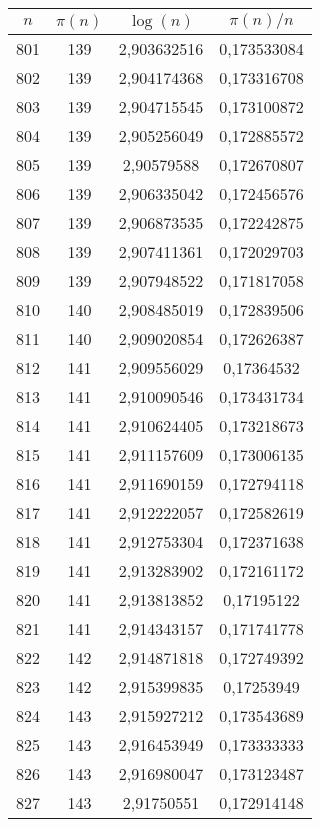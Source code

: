 {\begin{minipage}[!h]{0.45\textwidth}\centering
\tiny
\begin{longtable}{cccc} \hline
\(n\) & \(\pi(n)\) & \(\log(n)\) & \(\pi(n)/n\) \\ \hline
801 & 139 & 2,903632516 & 0,173533084 \\ \hline
802 & 139 & 2,904174368 & 0,173316708 \\ \hline
803 & 139 & 2,904715545 & 0,173100872 \\ \hline
804 & 139 & 2,905256049 & 0,172885572 \\ \hline
805 & 139 & 2,90579588 & 0,172670807 \\ \hline
806 & 139 & 2,906335042 & 0,172456576 \\ \hline
807 & 139 & 2,906873535 & 0,172242875 \\ \hline
808 & 139 & 2,907411361 & 0,172029703 \\ \hline
809 & 139 & 2,907948522 & 0,171817058 \\ \hline
810 & 140 & 2,908485019 & 0,172839506 \\ \hline
811 & 140 & 2,909020854 & 0,172626387 \\ \hline
812 & 141 & 2,909556029 & 0,17364532 \\ \hline
813 & 141 & 2,910090546 & 0,173431734 \\ \hline
814 & 141 & 2,910624405 & 0,173218673 \\ \hline
815 & 141 & 2,911157609 & 0,173006135 \\ \hline
816 & 141 & 2,911690159 & 0,172794118 \\ \hline
817 & 141 & 2,912222057 & 0,172582619 \\ \hline
818 & 141 & 2,912753304 & 0,172371638 \\ \hline
819 & 141 & 2,913283902 & 0,172161172 \\ \hline
820 & 141 & 2,913813852 & 0,17195122 \\ \hline
821 & 141 & 2,914343157 & 0,171741778 \\ \hline
822 & 142 & 2,914871818 & 0,172749392 \\ \hline
823 & 142 & 2,915399835 & 0,17253949 \\ \hline
824 & 143 & 2,915927212 & 0,173543689 \\ \hline
825 & 143 & 2,916453949 & 0,173333333 \\ \hline
826 & 143 & 2,916980047 & 0,173123487 \\ \hline
827 & 143 & 2,91750551 & 0,172914148 \\ \hline

\end{longtable}
\end{minipage}}
